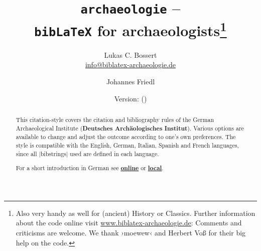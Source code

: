 \documentclass[a4paper,
10pt,
greek,
french,
spanish,
italian,
ngerman,
english
]{ltxdoc}
\begin{document}
\title{\texttt{archaeologie} -- \\\texttt{bib\LaTeX} for archaeologists\footnote{Also very handy as well for (ancient) History or Classics.
Further information about the code online visit \href{http://www.biblatex-archaeologie.de}{www.biblatex-archaeologie.de}: 
Comments and criticisms are welcome.
We thank  ›moewew‹ and Herbert Voß for their big help on the code.%
}}
\author{Lukas C. Bossert\\{\small \href{mailto:info@biblatex-archaeologie.de}{info@biblatex-archaeologie.de}} 
\and Johannes Friedl}
\date{Version: \archaeologieversion{} (\archaeologiedate)} 
\maketitle

\begin{abstract}
\noindent This citation-style covers the citation and bibliography rules of the German Archaeological Institute (\textbf{Deutsches Archäologisches Institut}). 
Various options are available to change and adjust the outcome according to one's own preferences. 
The style is compatible with the English, German, Italian, Spanish and French languages, since all |bibstrings| used are defined in each language.

For a short introduction in German see   \href{pdfdeu.biblatex-archaeologie.de}{\textbf{online}} or   \href{file:archaeologie-ger.pdf}{\textbf{local}}.
\end{abstract}


\begin{multicols}{2}
\footnotesize\parskip=0mm \tableofcontents
\end{multicols}
\end{document}
